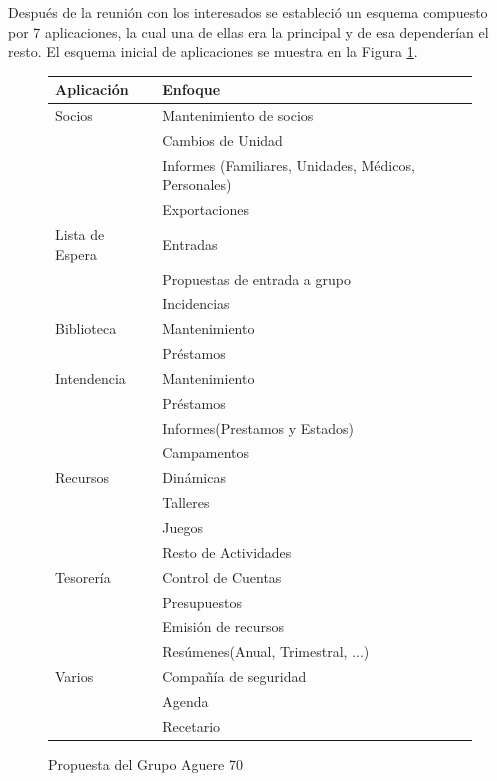 Después de la reunión con los interesados se estableció un esquema compuesto por 7 aplicaciones,
la cual una de ellas era la principal y de esa dependerían el resto. El esquema inicial de aplicaciones se muestra en la Figura \ref{fig:aplicaciones}.\\

\begin{figure}[H]
\begin{center}
\begin{tabular}{|p{30mm}|p{90mm}|} \hline 
\textbf{Aplicación} & \textbf{Enfoque} \\ \hline
Socios &
Mantenimiento de socios\\
& Cambios de Unidad\\
& Informes (Familiares, Unidades, Médicos, Personales)\\
& Exportaciones
\\
\hline

Lista de Espera &
Entradas \\
& Propuestas de entrada a grupo \\
& Incidencias
\\
\hline

Biblioteca &
Mantenimiento \\
& Préstamos
\\
\hline

Intendencia &
Mantenimiento \\
& Préstamos \\
& Informes(Prestamos y Estados) \\
& Campamentos
\\
\hline

Recursos &
Dinámicas \\
& Talleres \\
& Juegos \\
& Resto de Actividades
\\
\hline

Tesorería &
Control de Cuentas \\
& Presupuestos \\
& Emisión de recursos \\
& Resúmenes(Anual, Trimestral, ...)
\\
\hline

Varios &
Compañía de seguridad \\
& Agenda \\
& Recetario
\\
\hline

\end{tabular}
\caption{Propuesta del Grupo Aguere 70}
\label{fig:aplicaciones}
\end{center}
\end{figure}



